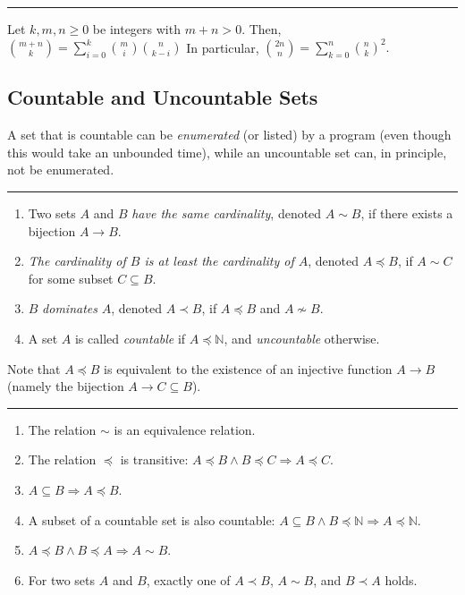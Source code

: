 \documentclass[a4paper]{extarticle}
\newcommand{\sep}{\vspace{5pt}\noindent\hrule\vspace{5pt}}
\begin{document}
\begin{multicols*}{2}
\sep

 Let $k,m,n\geq 0$ be integers with $m+n > 0$.
Then,
$
\binom{m+n}{k}=\sum_{i=0}^{k}\binom{m}{i}\binom{n}{k-i}
$
In particular,
$
\binom{2n}{n} = \sum_{k=0}^{n}\binom{n}{k}^2.
$

\subsection{Countable and Uncountable Sets}

A set that is countable can be \emph{enumerated} (or listed) by a program (even
though this would take an unbounded time), while an uncountable set can, in
principle, not be enumerated.

\sep


\begin{enumerate}[label=(\roman*)]
  \item Two sets $A$ and $B$ \emph{have the same cardinality}, denoted $A\sim
  B$, if there exists a bijection $A\to B$.
  \item \emph{The cardinality of $B$ is at least the cardinality of $A$},
  denoted $A\preceq B$, if $A\sim C$ for some subset $C\subseteq B$.
  \item $B$ \emph{dominates} $A$, denoted $A\prec B$, if $A\preceq B$ and $A
  \nsim B$.
  \item A set $A$ is called \emph{countable} if $A\preceq \mathbb{N}$, and
  \emph{uncountable} otherwise.
\end{enumerate}

Note that $A\preceq B$ is equivalent to the existence of an injective function
$A\to B	$ (namely the bijection $A\to C \subseteq B$).

\sep

\Lem
\begin{enumerate}[label=(\roman*)]
  \item The relation $\sim$ is an equivalence relation.
  \item The relation $\preceq$ is transitive: $A\preceq B \land B\preceq C
  \Longrightarrow A \preceq C.$
  \item $A\subseteq B \Longrightarrow A \preceq B$.
  \item A subset of a countable set is also countable: $A\subseteq B \land B
  \preceq \mathbb{N} \Longrightarrow A\preceq \mathbb{N}$.
  \item $A\preceq B \land B \preceq A \Longrightarrow A \sim B$.
  \item For two sets $A$ and $B$, exactly one of $A\prec B$, $A\sim B$, and
  $B\prec A$ holds.
\end{enumerate}


\end{multicols*}
\end{document}
